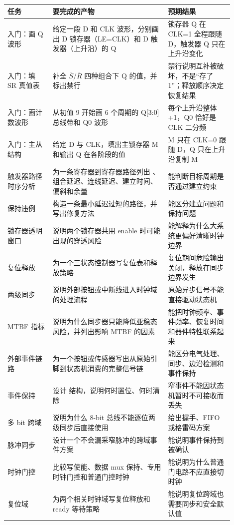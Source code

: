 \begin{longtable}{L{0.18\linewidth}L{0.46\linewidth}L{0.26\linewidth}}
\toprule
任务 & 要完成的产物 & 预期结果 \\
\midrule
入门：画 Q 波形 & 给定一段 D 和 CLK 波形，分别画出 D 锁存器（LE=CLK）和 D 触发器（上升沿）的 Q & 锁存器 Q 在 CLK=1 全程跟随 D，触发器 Q 只在上升沿变化 \\
入门：填 SR 真值表 & 补全 $\overline{S}$/$\overline{R}$ 四种组合下 Q 的值，并标出禁行 & 禁行说明互补被破坏，不是“存了 1”；释放顺序决定恢复结果 \\
入门：画计数波形 & 从初值 9 开始画 6 个周期的 Q[3:0] 总线带和 Q0 波形 & 每个上升沿整体 +1，Q0 恰好是 CLK 二分频 \\
入门：主从结构 & 给定 D 与 CLK，填出主锁存器 M 和输出 Q 在各阶段的值 & M 只在 CLK=0 跟随 D，Q 只在上升沿复制 M \\
触发器路径时序分析 & 为一条寄存器到寄存器路径列出 、组合延迟、连线延迟、建立时间、偏斜和余量 & 能判断目标周期是否通过建立约束 \\
保持违例 & 构造一条最小延迟过短的路径，并写出修复方法 & 能区分建立问题和保持问题 \\
锁存器透明窗口 & 说明两个锁存器共用 enable 时可能出现的穿透风险 & 能解释为什么大系统更偏好清晰时钟边界 \\
复位释放 & 为一个三状态控制器写复位表和释放策略 & 复位期间危险输出关闭，释放在同步边界发生 \\
两级同步 & 说明外部按钮或中断线进入时钟域的处理流程 & 原始异步信号不能直接驱动状态机 \\
MTBF 指标 & 说明为什么同步器只能降低亚稳态风险，并列出影响 MTBF 的因素 & 能把时钟频率、事件频率、恢复时间和器件特性联系起来 \\
外部事件链路 & 为一个按钮或传感器写出从原始引脚到状态机消费的完整信号链 & 能区分电气处理、同步、边沿检测和事件保持 \\
事件保持 & 设计  结构，说明何时置位、何时清除 & 窄事件不能因状态机暂时不可接收而丢失 \\
多 bit 跨域 & 说明为什么 8-bit 总线不能逐位两级同步后直接使用 & 给出握手、FIFO 或格雷码方案 \\
脉冲同步 & 设计一个不会漏采窄脉冲的跨域事件方案 & 能说明事件保持到被确认 \\
时钟门控 & 比较写使能、数据 mux 保持、专用时钟门控和普通门控时钟 & 能说明为什么普通门电路不应直接切时钟 \\
复位域 & 为两个相关时钟域写复位释放和 ready 等待策略 & 能说明复位跨域也需要同步和安全默认值 \\

\end{longtable}
